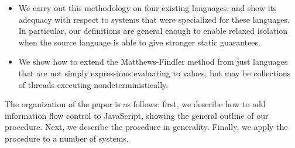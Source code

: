 {\begin{itemize}
    \item We carry out this methodology on four existing languages, and
        show its adequacy with respect to systems that were specialized
        for these languages.  In particular, our definitions are general
        enough to enable relaxed isolation when the source language is
        able to give stronger static guarantees.

    \item We show how to extend the Matthews-Findler method from just
        languages that are not simply expressions evaluating to values,
        but may be collections of threads executing nondeterministically.
\end{itemize}

The organization of the paper is as follows: first, we describe how to
add information flow control to JavaScript, showing the general outline of
our procedure. Next, we describe the procedure in generality.  Finally, we
apply the procedure to a number of systems.
}


